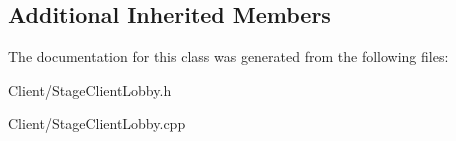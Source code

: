\subsection*{Additional Inherited Members}


The documentation for this class was generated from the following files\-:\begin{DoxyCompactItemize}
\item 
Client/Stage\-Client\-Lobby.\-h\item 
Client/Stage\-Client\-Lobby.\-cpp\end{DoxyCompactItemize}
